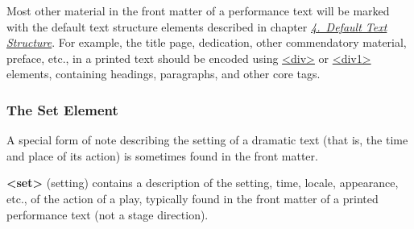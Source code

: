 Most other material in the front matter of a performance text will be marked with the default text structure elements described in chapter \textit{\hyperref[DS]{4.\ Default Text Structure}}. For example, the title page, dedication, other commendatory material, preface, etc., in a printed text should be encoded using \hyperref[TEI.div]{<div>} or \hyperref[TEI.div1]{<div1>} elements, containing headings, paragraphs, and other core tags.
\subsubsection[{The Set Element}]{The Set Element}\label{DRSET}\par
A special form of note describing the setting of a dramatic text (that is, the time and place of its action) is sometimes found in the front matter. 
\begin{sansreflist}
  
\item [\textbf{<set>}] (setting) contains a description of the setting, time, locale, appearance, etc., of the action of a play, typically found in the front matter of a printed performance text (not a stage direction).
\end{sansreflist}
